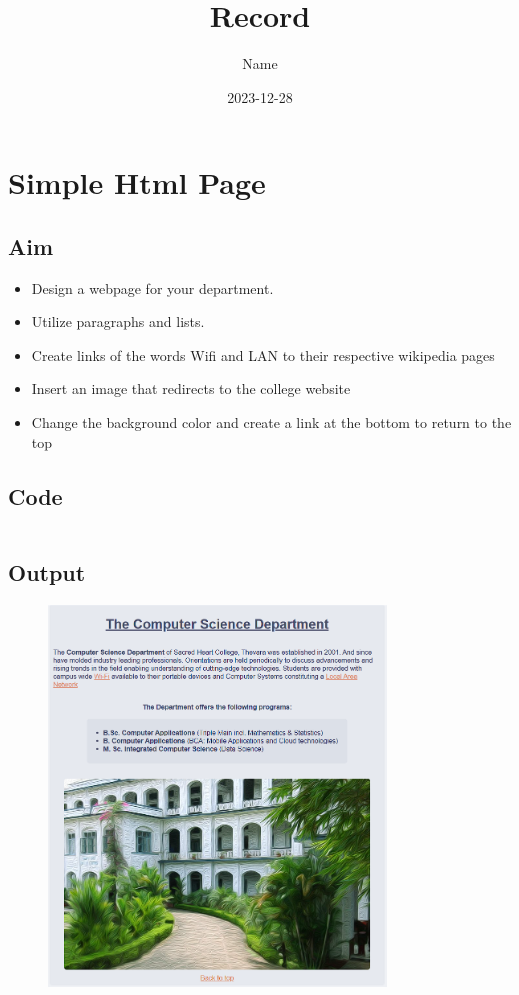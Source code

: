 \documentclass{article}
\title{Record}
\author{Name}
\date{2023-12-28}
\begin{document}
  
  \newpage
  \tableofcontents
  \newpage

  \section{Simple Html Page}
    \subsection*{Aim}
    \begin{itemize}
      \item Design a webpage for your department.
      \item Utilize paragraphs and lists.
      \item Create links of the words Wifi and LAN to their respective wikipedia pages
      \item Insert an image that redirects to the college website
      \item Change the background color and create a link at the bottom to return to the top
    \end{itemize}

    \subsection*{Code}
      \inputminted[frame=lines, linenos, breaklines, breakanywhere, numberblanklines=false]{html}{./prog_1/index.html}

    \subsection*{Output}
    \begin{figure}[h!]
    \centering
    \includegraphics[width=0.8\textwidth]{./Assets/p0101.png}
    \end{figure}
  \newpage
\end{document}
